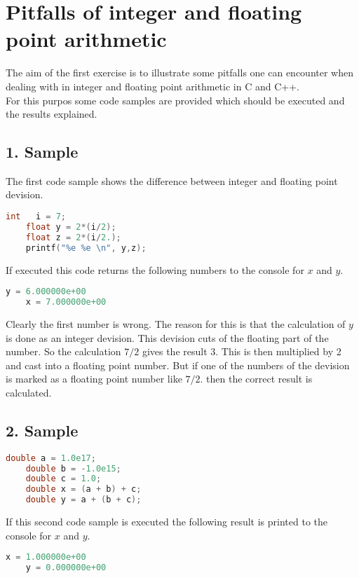 \section{Pitfalls of integer and floating point arithmetic}

The aim of the first exercise is to illustrate some pitfalls one can encounter when dealing
with in integer and floating point arithmetic in C and C++.\\
For this purpos some code samples are provided which should be executed and the results 
explained.

\subsection*{1. Sample}
The first code sample shows the difference between integer and floating point devision.
\begin{lstlisting}[language=C++]
    int   i = 7;
    float y = 2*(i/2);
    float z = 2*(i/2.);
    printf("%e %e \n", y,z); 
\end{lstlisting}
If executed this code returns the following numbers to the console 
for $x$ and $y$.

\begin{lstlisting}[language=C++]
    y = 6.000000e+00
    x = 7.000000e+00
\end{lstlisting}

Clearly the first number is wrong. The reason for this is that the calculation of 
$y$ is done as an integer devision. This devision cuts of the floating part of the number.
So the calculation $7/2$ gives the result 3. This is then multiplied by 2 and cast into a
floating point number. But if one of the numbers of the devision is marked as a floating 
point number like $7/2.$ then the correct result is calculated.

\subsection*{2. Sample}
\begin{lstlisting}[language=C++]
    double a = 1.0e17;
    double b = -1.0e15;
    double c = 1.0;
    double x = (a + b) + c;
    double y = a + (b + c);

\end{lstlisting}

If this second code sample is executed the following 
result is printed to the console for $x$ and $y$.

\begin{lstlisting}[language=C++]
    x = 1.000000e+00
    y = 0.000000e+00 
    
\end{lstlisting}

